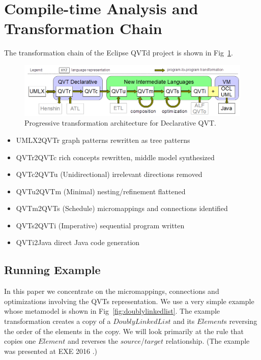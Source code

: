 \documentclass{llncs}
\begin{document}
\section{Compile-time Analysis and Transformation Chain}\label{Analysis}

The transformation chain of the Eclipse QVTd project is shown in Fig~\ref{fig:architecture}.

\begin{figure}[h]
	\centering
	\includegraphics[width=1.0\textwidth]{QVThorizontalAlphabet.png}
	\caption{Progressive transformation architecture for Declarative QVT.}
	\label{fig:architecture}
\end{figure}

\begin{itemize}
	\item UMLX2QVTr graph patterns rewritten as tree patterns
	\item QVTr2QVTc rich concepts rewritten, middle model synthesized
	\item QVTc2QVTu (Unidirectional) irrelevant directions removed
	\item QVTu2QVTm (Minimal) nesting/refinement flattened
	\item QVTm2QVTs (Schedule) micromappings and connections identified
	\item QVTs2QVTi (Imperative) sequential program written
	\item QVTi2Java direct Java code generation
\end{itemize} 

\subsection{Running Example}

In this paper we concentrate on the micromappings, connections and optimizations involving the QVTs representation. We use a very simple example whose metamodel is shown in Fig~\ref{fig:doublylinkedlist}. The example transformation creates a copy of a $DoublyLinkedList$ and its $Element$s reversing the order of the elements in the copy. We will look primarily at the rule that copies one $Element$ and reverses the $source$/$target$ relationship. (The example was presented at EXE 2016 \cite{Willink-EXE2016}.)
\end{document}
